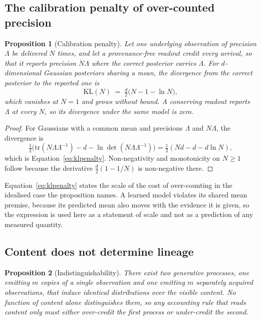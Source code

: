 \documentclass{article}
\newtheorem{proposition}{Proposition}
\begin{document}
\subsection{The calibration penalty of over-counted precision}

\begin{proposition}[Calibration penalty]
\label{prop:calibration}
Let one underlying observation of precision $\Lambda$ be delivered $N$ times,
and let a provenance-free readout credit every arrival, so that it reports
precision $N\Lambda$ where the correct posterior carries $\Lambda$. For
$d$-dimensional Gaussian posteriors sharing a mean, the divergence from the
correct posterior to the reported one is
\begin{equation}
\mathrm{KL}(N) \;=\; \tfrac{d}{2}\bigl(N - 1 - \ln N\bigr),
\label{eq:klpenalty}
\end{equation}
which vanishes at $N=1$ and grows without bound. A conserving readout reports
$\Lambda$ at every $N$, so its divergence under the same model is zero.
\end{proposition}

\begin{proof}
For Gaussians with a common mean and precisions $\Lambda$ and $N\Lambda$, the
divergence is
\[
\tfrac{1}{2}\bigl(\mathrm{tr}(N\Lambda\Lambda^{-1}) - d
- \ln\det(N\Lambda\Lambda^{-1})\bigr)
= \tfrac{1}{2}(Nd - d - d\ln N),
\]
which is Equation~\ref{eq:klpenalty}.
Non-negativity and monotonicity on $N \geq 1$ follow because the derivative
$\tfrac{d}{2}(1 - 1/N)$ is non-negative there.
\end{proof}

Equation~\ref{eq:klpenalty} states the scale of the cost of over-counting in
the idealised case the proposition names. A learned model violates its shared
mean premise, because its predicted mean also moves with the evidence it is
given, so the expression is used here as a statement of scale and not as a
prediction of any measured quantity.

\subsection{Content does not determine lineage}

\begin{proposition}[Indistinguishability]
\label{prop:indist}
There exist two generative processes, one emitting $m$ copies of a single
observation and one emitting $m$ separately acquired observations, that induce
identical distributions over the visible content. No function of content alone
distinguishes them, so any accounting rule that reads content only must either
over-credit the first process or under-credit the second.
\end{proposition}
\end{document}
